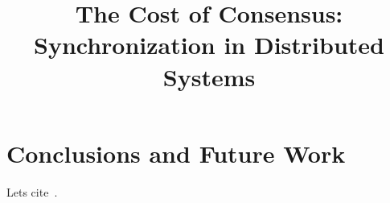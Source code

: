 \documentclass[10pt, conference]{IEEEtran}
\title{The Cost of Consensus: Synchronization in Distributed Systems}
\begin{document}
\maketitle

\begin{abstract}

\end{abstract}

\begin{keywords}
\end{keywords}









\section{Conclusions and Future Work}\label{sec:conclusions}
Lets cite~\cite{Cooper:2008:PYH:1454159.1454167}.







\end{document}
